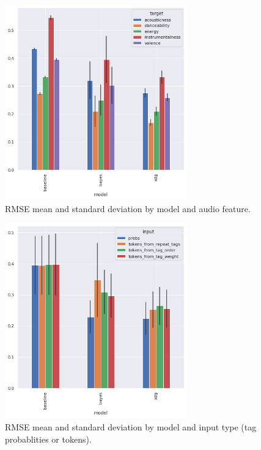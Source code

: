 \documentclass[sn-mathphys]{sn-jnl}%
\theoremstyle{thmstyleone}%
\theoremstyle{thmstyletwo}%
\theoremstyle{thmstylethree}%
\begin{document}
\begin{figure}[h!]
      \centering
      \includegraphics[width=0.7\textwidth]{images/rmse_by_model_and_feature.png}
      \caption{RMSE mean and standard deviation by model and audio feature.}
      \label{fig:rmse_by_model_and_feature}
\end{figure}


\begin{figure}[h!]
      \centering
      \includegraphics[width=0.7\textwidth]{images/rmse_by_model_and_input.png}
      \caption{RMSE mean and standard deviation by model and input type (tag probablities or tokens).}
      \label{fig:rmse_by_model_and_input}
\end{figure}
\end{document}
